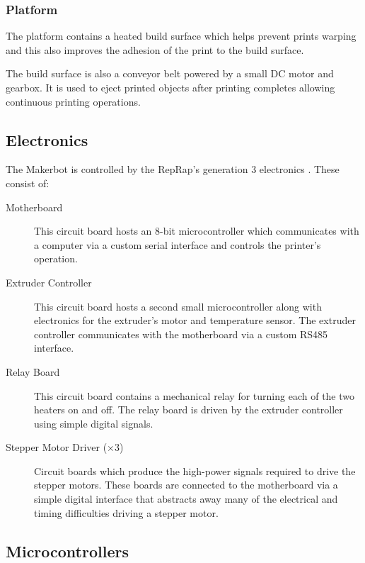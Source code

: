 			\subsubsection{Platform}
				
				The platform contains a heated build surface which  helps prevent prints
				warping and this also improves the adhesion of the print to the build surface.
				
				The build surface is also a conveyor belt powered by a small DC motor
				and gearbox. It is used to eject printed objects after printing
				completes allowing continuous printing operations.
				
		\subsection{Electronics}
		
			The Makerbot is controlled by the RepRap's generation 3 electronics
			\cite{reprapelectronics}. These
			consist of:
			\begin{description}
				
				\item[Motherboard] This circuit board hosts an 8-bit microcontroller
				which communicates with a computer via a custom serial interface and
				controls the printer's operation.
				
				\item[Extruder Controller] This circuit board hosts a second small
				microcontroller along with electronics for the extruder's motor and
				temperature sensor.  The extruder controller communicates with the
				motherboard via a custom RS485 interface.
				
				\item[Relay Board] This circuit board contains a mechanical relay for
				turning each of the two heaters on and off. The relay board is driven by
				the extruder controller using simple digital signals.
				
				\item[Stepper Motor Driver ($\times 3$)] Circuit boards which produce
				the high-power signals required to drive the stepper motors. These
				boards are connected to the motherboard via a simple digital interface
				that abstracts away many of the electrical and timing difficulties
				driving a stepper motor.
				
			\end{description}
	
		\subsection{Microcontrollers}
			
